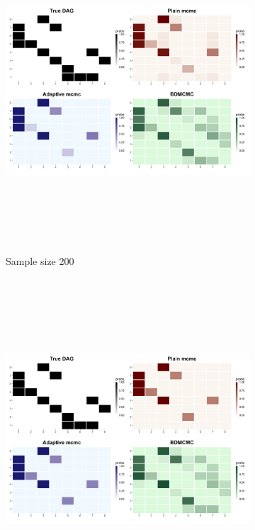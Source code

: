 \documentclass{report}
\begin{document}
\begin{figure}[!ht]
{\begin{minipage}{\textwidth}
			\begin{subfigure}[b]{0.45\textwidth}   
				\centering
				\includegraphics[width=\textwidth, height=12cm]{Figures/Overall_comparison/Random_dags/heat_dag_4_n_200.png}
				\caption{Sample size 200}
				\label{fig:heatmaps-200}
			\end{subfigure}
			\hspace{0.35cm}  %
			\begin{subfigure}[b]{0.45\textwidth}   
				\centering
				\includegraphics[width=\textwidth, height=12cm]{Figures/Overall_comparison/Random_dags/heat_dag_4_n_500.png}

\end{subfigure}
\end{minipage}}
\end{figure}
\end{document}
